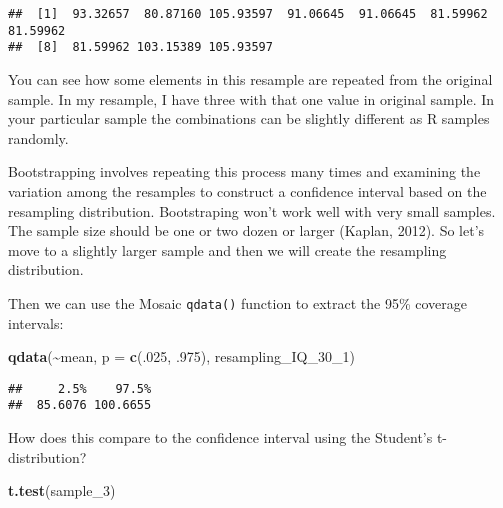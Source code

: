 \documentclass[
]{book}
\newenvironment{Shaded}{\begin{snugshade}}{\end{snugshade}}
\newcommand{\AttributeTok}[1]{\textcolor[rgb]{0.13,0.29,0.53}{#1}}
\newcommand{\DecValTok}[1]{\textcolor[rgb]{0.00,0.00,0.81}{#1}}
\newcommand{\FunctionTok}[1]{\textcolor[rgb]{0.13,0.29,0.53}{\textbf{#1}}}
\newcommand{\NormalTok}[1]{#1}
\newcommand{\OtherTok}[1]{\textcolor[rgb]{0.56,0.35,0.01}{#1}}
\newcommand{\SpecialCharTok}[1]{\textcolor[rgb]{0.81,0.36,0.00}{\textbf{#1}}}
\begin{document}
\begin{verbatim}
##  [1]  93.32657  80.87160 105.93597  91.06645  91.06645  81.59962  81.59962
##  [8]  81.59962 103.15389 105.93597
\end{verbatim}

You can see how some elements in this resample are repeated from the original sample. In my resample, I have three with that one value in original sample. In your particular sample the combinations can be slightly different as R samples randomly.

Bootstrapping involves repeating this process many times and examining the variation among the resamples to construct a confidence interval based on the resampling distribution. Bootstraping won't work well with very small samples. The sample size should be one or two dozen or larger (Kaplan, 2012). So let's move to a slightly larger sample and then we will create the resampling distribution.

\begin{Shaded}
\end{Shaded}

Then we can use the Mosaic \texttt{qdata()} function to extract the 95\% coverage intervals:

\begin{Shaded}
\begin{Highlighting}[]
\FunctionTok{qdata}\NormalTok{(}\SpecialCharTok{\textasciitilde{}}\NormalTok{mean, }\AttributeTok{p =} \FunctionTok{c}\NormalTok{(.}\DecValTok{025}\NormalTok{, .}\DecValTok{975}\NormalTok{), resampling\_IQ\_30\_1)}
\end{Highlighting}
\end{Shaded}

\begin{verbatim}
##     2.5%    97.5% 
##  85.6076 100.6655
\end{verbatim}

How does this compare to the confidence interval using the Student's t-distribution?

\begin{Shaded}
\begin{Highlighting}[]
\FunctionTok{t.test}\NormalTok{(sample\_3)}
\end{Highlighting}
\end{Shaded}
\end{document}
